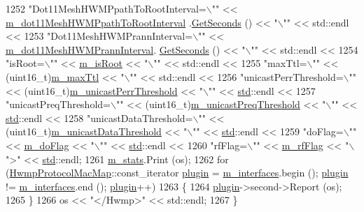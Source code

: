 \begin{DoxyCode}
1252   \textcolor{stringliteral}{"Dot11MeshHWMPpathToRootInterval=\(\backslash\)""} << \hyperlink{classns3_1_1dot11s_1_1HwmpProtocol_ab01e8ec195410954227b273627e1d733}{m\_dot11MeshHWMPpathToRootInterval}
      .\hyperlink{classns3_1_1Time_a8f20d5c3b0902d7b4320982f340b57c8}{GetSeconds} () << \textcolor{stringliteral}{"\(\backslash\)""} << std::endl <<
1253   \textcolor{stringliteral}{"Dot11MeshHWMPrannInterval=\(\backslash\)""} << \hyperlink{classns3_1_1dot11s_1_1HwmpProtocol_a253b285768b092f926638d9b517085f4}{m\_dot11MeshHWMPrannInterval}.
      \hyperlink{classns3_1_1Time_a8f20d5c3b0902d7b4320982f340b57c8}{GetSeconds} () << \textcolor{stringliteral}{"\(\backslash\)""} << std::endl <<
1254   \textcolor{stringliteral}{"isRoot=\(\backslash\)""} << \hyperlink{classns3_1_1dot11s_1_1HwmpProtocol_a4664b89c3ad6d74c0010e64c2ac1dc03}{m\_isRoot} << \textcolor{stringliteral}{"\(\backslash\)""} << std::endl <<
1255   \textcolor{stringliteral}{"maxTtl=\(\backslash\)""} << (uint16\_t)\hyperlink{classns3_1_1dot11s_1_1HwmpProtocol_aeb6a1f36357cb71cf8d41749f65a3edc}{m\_maxTtl} << \textcolor{stringliteral}{"\(\backslash\)""} << std::endl <<
1256   \textcolor{stringliteral}{"unicastPerrThreshold=\(\backslash\)""} << (uint16\_t)\hyperlink{classns3_1_1dot11s_1_1HwmpProtocol_aefbf7cb9cf17384c98b897048222fbf6}{m\_unicastPerrThreshold} << "\(\backslash\)"" << 
      \hyperlink{namespacestd}{std}::endl <<
1257   "unicastPreqThreshold=\(\backslash\)"" << (uint16\_t)\hyperlink{classns3_1_1dot11s_1_1HwmpProtocol_a3461bf4ea09ad4241bf000d499e46e02}{m\_unicastPreqThreshold} << "\(\backslash\)"" << 
      \hyperlink{namespacestd}{std}::endl <<
1258   "unicastDataThreshold=\(\backslash\)"" << (uint16\_t)\hyperlink{classns3_1_1dot11s_1_1HwmpProtocol_a1306d9f72e6800618a039c0a681166ad}{m\_unicastDataThreshold} << "\(\backslash\)"" << 
      \hyperlink{namespacestd}{std}::endl <<
1259   "doFlag=\(\backslash\)"" << \hyperlink{classns3_1_1dot11s_1_1HwmpProtocol_abc04d85e45d9f1584d143bb81b8e1b8f}{m\_doFlag} << "\(\backslash\)"" << \hyperlink{namespacestd}{std}::endl <<
1260   "rfFlag=\(\backslash\)"" << \hyperlink{classns3_1_1dot11s_1_1HwmpProtocol_a8b777951609e6dc5af0f56275c964ad5}{m\_rfFlag} << "\(\backslash\)">" << \hyperlink{namespacestd}{std}::endl;
1261   \hyperlink{classns3_1_1dot11s_1_1HwmpProtocol_a478a13e7ec9ca167a5b13b38237d17ae}{m\_stats}.Print (os);
1262   for (\hyperlink{classns3_1_1dot11s_1_1HwmpProtocol_affcc6c0fdecdf3c6160d356e86aeb8ed}{HwmpProtocolMacMap}::const\_iterator \hyperlink{visualizer-ideas_8txt_a82212ee380150b652f4dad598413d06f}{plugin} = 
      \hyperlink{classns3_1_1dot11s_1_1HwmpProtocol_ae2cee085d1d2b9d32b509b710c0b4511}{m\_interfaces}.begin (); \hyperlink{visualizer-ideas_8txt_a82212ee380150b652f4dad598413d06f}{plugin} != \hyperlink{classns3_1_1dot11s_1_1HwmpProtocol_ae2cee085d1d2b9d32b509b710c0b4511}{m\_interfaces}.end (); 
      \hyperlink{visualizer-ideas_8txt_a82212ee380150b652f4dad598413d06f}{plugin}++)
1263     \{
1264       \hyperlink{visualizer-ideas_8txt_a82212ee380150b652f4dad598413d06f}{plugin}->second->Report (os);
1265     \}
1266   os << \textcolor{stringliteral}{"</Hwmp>"} << std::endl;
1267 \}
\end{DoxyCode}


